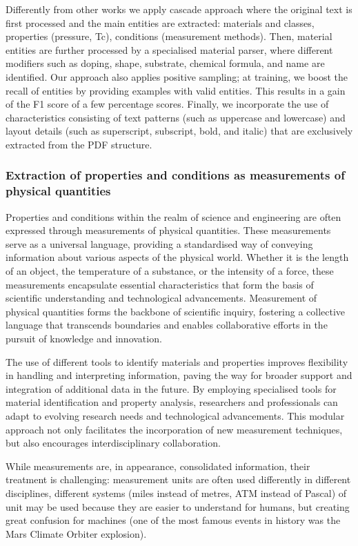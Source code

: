 Differently from other works we apply cascade approach where the original text is first processed and the main entities are extracted: materials and classes, properties (pressure, Tc), conditions (measurement methods). 
Then, material entities are further processed by a specialised material parser, where different modifiers such as doping, shape, substrate, chemical formula, and name are identified. 
Our approach also applies positive sampling; at training, we boost the recall of entities by providing examples with valid entities. This results in a gain of the F1 score of a few percentage scores. 
Finally, we incorporate the use of characteristics consisting of text patterns (such as uppercase and lowercase) and layout details (such as superscript, subscript, bold, and italic) that are exclusively extracted from the PDF structure.

\subsubsection{Extraction of properties and conditions as measurements of physical quantities}

Properties and conditions within the realm of science and engineering are often expressed through measurements of physical quantities. These measurements serve as a universal language, providing a standardised way of conveying information about various aspects of the physical world. Whether it is the length of an object, the temperature of a substance, or the intensity of a force, these measurements encapsulate essential characteristics that form the basis of scientific understanding and technological advancements.
Measurement of physical quantities forms the backbone of scientific inquiry, fostering a collective language that transcends boundaries and enables collaborative efforts in the pursuit of knowledge and innovation.

The use of different tools to identify materials and properties improves flexibility in handling and interpreting information, paving the way for broader support and integration of additional data in the future. By employing specialised tools for material identification and property analysis, researchers and professionals can adapt to evolving research needs and technological advancements. This modular approach not only facilitates the incorporation of new measurement techniques, but also encourages interdisciplinary collaboration.

While measurements are, in appearance, consolidated information, their treatment is challenging: measurement units are often used differently in different disciplines, different systems (miles instead of metres, ATM instead of Pascal) of unit may be used because they are easier to understand for humans, but creating great confusion for machines (one of the most famous events in history was the Mars Climate Orbiter explosion). 


